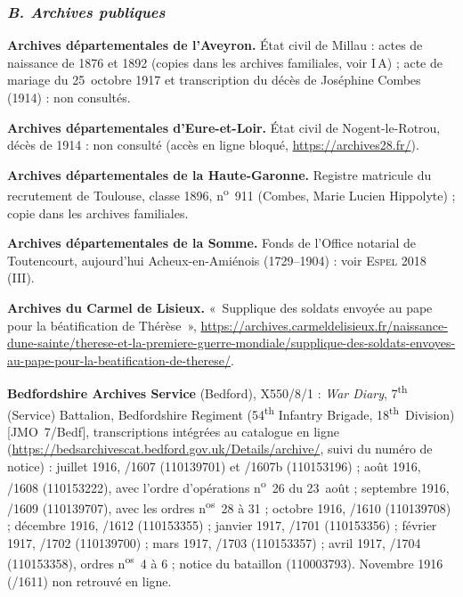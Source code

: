 \subsubsection*{\normalsize\mdseries\itshape B. Archives publiques}

\begin{biblist}
\item \textbf{Archives départementales de l'Aveyron.} État civil de Millau : actes de naissance de 1876 et 1892 (copies dans les archives familiales, voir I\,A) ; acte de mariage du 25~octobre 1917 et transcription du décès de Joséphine Combes (1914) : non consultés.
\item \textbf{Archives départementales d'Eure-et-Loir.} État civil de Nogent-le-Rotrou, décès de 1914 : non consulté (accès en ligne bloqué, \url{https://archives28.fr/}).
\item \textbf{Archives départementales de la Haute-Garonne.} Registre matricule du recrutement de Toulouse, classe 1896, n\textsuperscript{o}~911 (Combes, Marie Lucien Hippolyte) ; copie dans les archives familiales.
\item \textbf{Archives départementales de la Somme.} Fonds de l'Office notarial de Toutencourt, aujourd'hui Acheux-en-Amiénois (1729--1904) : voir \textsc{Espel} 2018 (III).
\item \textbf{Archives du Carmel de Lisieux.} «~Supplique des soldats envoyée au pape pour la béatification de Thérèse~», \url{https://archives.carmeldelisieux.fr/naissance-dune-sainte/therese-et-la-premiere-guerre-mondiale/supplique-des-soldats-envoyes-au-pape-pour-la-beatification-de-therese/}.
\item \textbf{Bedfordshire Archives Service} (Bedford), X550/8/1 : \textit{War Diary}, 7\textsuperscript{th} (Service) Battalion, Bedfordshire Regiment (54\textsuperscript{th} Infantry Brigade, 18\textsuperscript{th}~Division) [JMO~7/Bedf], transcriptions intégrées au catalogue en ligne (\url{https://bedsarchivescat.bedford.gov.uk/Details/archive/}, suivi du numéro de notice) : juillet 1916, /1607 (110139701) et /1607b (110153196) ; août 1916, /1608 (110153222), avec l'ordre d'opérations n\textsuperscript{o}~26 du 23~août ; septembre 1916, /1609 (110139707), avec les ordres n\textsuperscript{os}~28 à 31 ; octobre 1916, /1610 (110139708) ; décembre 1916, /1612 (110153355) ; janvier 1917, /1701 (110153356) ; février 1917, /1702 (110139700) ; mars 1917, /1703 (110153357) ; avril 1917, /1704 (110153358), ordres n\textsuperscript{os}~4 à 6 ; notice du bataillon (110003793). Novembre 1916 (/1611) non retrouvé en ligne.

\end{biblist}
